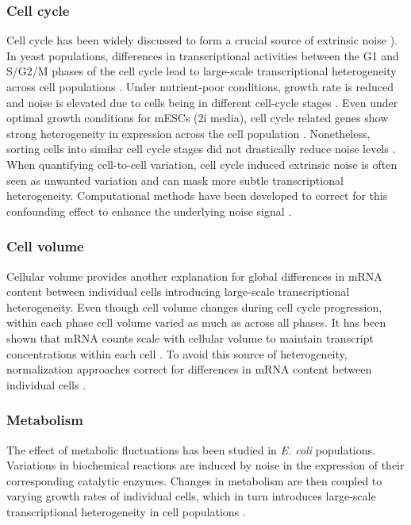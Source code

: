 \subsubsection{Cell cycle}

Cell cycle has been widely discussed to form a crucial source of extrinsic noise \citep{Colman-Lerner2005a, Newman2006}). In yeast populations, differences in transcriptional activities between the G1 and S/G2/M phases of the cell cycle lead to large-scale transcriptional heterogeneity across cell populations \citep{Zopf2013}. Under nutrient-poor conditions, growth rate is reduced and noise is elevated due to cells being in different cell-cycle stages \citep{Keren2015}.  Even under optimal growth conditions for mESCs (2i media), cell cycle related genes show strong heterogeneity in expression across the cell population \citep{Kolodziejczyk2015cell}. Nonetheless, sorting cells into similar cell cycle stages did not drastically reduce noise levels \citep{Raser2004}. When quantifying cell-to-cell variation, cell cycle induced extrinsic noise is often seen as unwanted variation and can mask more subtle transcriptional heterogeneity. Computational methods have been developed to correct for this confounding effect to enhance the underlying noise signal \citep{Buettner2015, Buettner2017}. 

\subsubsection{Cell volume}

Cellular volume provides another explanation for global differences in mRNA content between individual cells introducing large-scale transcriptional heterogeneity. Even though cell volume changes during cell cycle progression, within each phase cell volume varied as much as across all phases. It has been shown that mRNA counts scale with cellular volume to maintain transcript concentrations within each cell \citep{Kempe2015, Padovan-Merhar2015, Zhurinsky2010}. To avoid this source of heterogeneity, normalization approaches correct for differences in mRNA content between individual cells \citep{Vallejos2017}.

\subsubsection{Metabolism}

The effect of metabolic fluctuations has been studied in \textit{E. coli} populations. Variations in biochemical reactions are induced by noise in the expression of their corresponding catalytic enzymes. Changes in metabolism are then coupled to varying growth rates of individual cells, which in turn introduces large-scale transcriptional heterogeneity in cell populations \citep{Kiviet2014}.  

